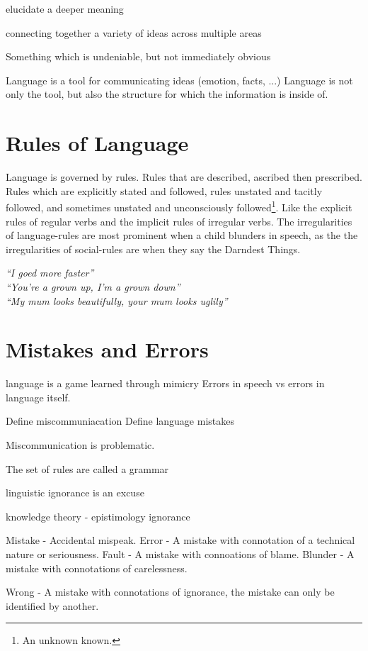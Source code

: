 elucidate a deeper meaning

connecting together a variety of ideas across multiple areas

Something which is undeniable, but not immediately obvious



Language is a tool for communicating ideas (emotion, facts, ...)
Language is not only the tool, but also the structure for which the information is inside of.








\section{Rules of Language}
Language is governed by rules. Rules that are described, ascribed then prescribed. Rules which are explicitly stated and followed, rules unstated and tacitly followed, and sometimes unstated and unconsciously followed\footnote{An unknown known.}. Like the explicit rules of regular verbs and the implicit rules of irregular verbs. The irregularities of language-rules are most prominent when a child blunders in speech, as the the irregularities of social-rules are when they say the Darndest Things.

\begin{center}
\textit{``I goed more faster''
\\``You're a grown up, I'm a grown down''
\\``My mum looks beautifully, your mum looks uglily''
}
\end{center}

\section{Mistakes and Errors}

language is a game learned through mimicry
Errors in speech vs errors in language itself.

Define miscommuniacation
Define language mistakes

Miscommunication is problematic.

The set of rules are called a grammar

linguistic ignorance is an excuse

knowledge theory - epistimology
ignorance

Mistake - Accidental mispeak.
Error - A mistake with connotation of a technical nature or seriousness.
Fault - A mistake with connoations of blame.
Blunder - A mistake with connotations of carelessness.

Wrong - A mistake with connotations of ignorance, the mistake can only be identified by another.

